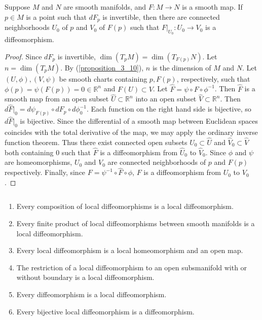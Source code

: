 \begin{customthm}{4.5}\label{prop_4_5}
  Suppose $M$ and $N$ are smooth manifolds, and $F: M \rightarrow N$ is a smooth map.
  If $p \in M$ is a point such that $dF_p$ is invertible, then there are connected neighborhoods $U_0$ of $p$ and $V_0$ of $F(p)$ such that $F\vert_{U_0}: U_0 \rightarrow V_0$ is a diffeomorphism.
\end{customthm}

\begin{proof}
  Since $dF_p$ is invertible, $\dim(T_pM) = \dim(T_{F(p)}N)$.
  Let $n = \dim(T_pM)$.
  By (\ref{proposition_3_10}), $n$ is the dimension of $M$ and $N$.
  Let $(U, \phi), (V, \psi)$ be smooth charts containing $p, F(p)$, respectively, such that $\phi(p) = \psi(F(p)) = 0 \in \mathbb{R}^n$ and $F(U) \subset V$.
  Let $\hat{F} = \psi \circ F \circ \phi^{-1}$.
  Then $\hat{F}$ is a smooth map from an open subset $\hat{U} \subset \mathbb{R}^n$ into an open subset $\hat{V} \subset \mathbb{R}^n$.
  Then $d\hat{F}\vert_0 = d\psi_{F(p)} \circ dF_p \circ d\phi^{-1}_0$.
  Each function on the right hand side is bijective, so $d\hat{F}\vert_0$ is bijective.
  Since the differential of a smooth map between Euclidean spaces coincides with the total derivative of the map, we may apply the ordinary inverse function theorem.
  Thus there exist connected open subsets $\hat{U}_0 \subset \hat{U}$ and $\hat{V}_0 \subset \hat{V}$ both containing 0 such that $\hat{F}$ is a diffeomorphism from $\hat{U}_0$ to $\hat{V}_0$.
  Since $\phi$ and $\psi$ are homeomorphisms, $U_0$ and $V_0$ are connected neighborhoods of $p$ and $F(p)$ respectively.
  Finally, since $F = \psi^{-1} \circ \hat{F} \circ \phi$, $F$ is a diffeomorphism from $U_0$ to $V_0$.
\end{proof}

\begin{customthm}{4.6}
  $ $
  \begin{enumerate}[label=(\alph*)]
    \item 
      Every composition of local diffeomorphisms is a local diffeomorphism.
    \item
      Every finite product of local diffeomorphisms between smooth manifolds is a local diffeomorphism.
    \item
      Every local diffeomorphism is a local homeomorphism and an open map.
    \item
      The restriction of a local diffeomorphism to an open subsmanifold with or without boundary is a local diffeomorphism.
    \item
      Every diffeomorphism is a local diffeomorphism.
    \item
      Every bijective local diffeomorphism is a diffeomorphism.
  \end{enumerate}
\end{customthm}

